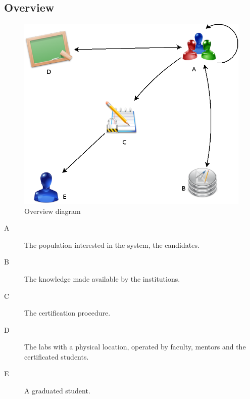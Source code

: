 \clearpage

\subsection{Overview}

\begin{figure}[htb]
   \centering
   \includegraphics[width=1\columnwidth]{images/diagram.png}
   \caption{Overview diagram}
   \label{fig:overview_diagram}
\end{figure}


\begin{description}
    \item[A] The population interested in the system, the candidates.
    \item[B] The knowledge made available by the institutions.
    \item[C] The certification procedure.
    \item[D] The labs with a physical location, operated by faculty, mentors and the
    certificated students.
    \item[E] A graduated student.
\end{description}

